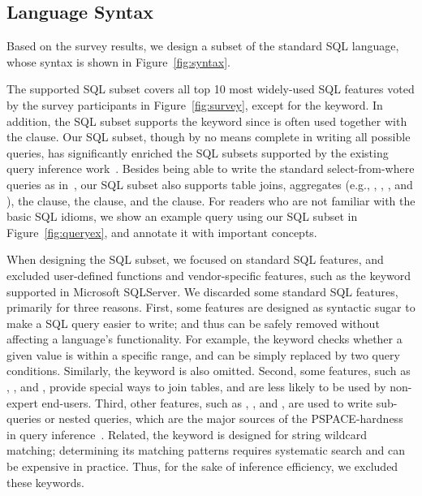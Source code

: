 \subsection{Language Syntax}
\label{sec:syntax}

Based on the survey results, we design a subset
of the standard SQL language, whose
syntax is shown in Figure~\ref{fig:syntax}.


The supported SQL subset covers all top 10 most widely-used SQL
features voted by the survey participants
in Figure~\ref{fig:survey}, except for the  keyword.
In addition, the SQL subset supports the 
keyword since  is often used together with the  clause.
Our SQL subset, though by no means complete in writing all
possible queries, has significantly
enriched the SQL subsets supported by the existing query inference
work~\cite{DasSarma:2010, Tran:2009}. Besides being able to write the
standard select-from-where queries as in~\cite{DasSarma:2010, Tran:2009},
our SQL subset also supports table joins, aggregates
(e.g., , , , and ),
the  clause, the  clause,
and the  clause. For readers who are not
familiar with the basic SQL idioms, we show an example query
using our SQL subset in Figure~\ref{fig:queryex}, and annotate
it with important concepts.


When designing the SQL subset, we focused on standard
SQL features, and excluded user-defined functions and
vendor-specific features, such as the 
keyword supported in Microsoft SQLServer. 
We discarded some standard SQL features, primarily for
three reasons. First, some features are designed
as syntactic sugar to make a SQL query easier to write;
and thus can be safely removed without affecting a language's
functionality. For example, the 
keyword checks whether a given value is within a specific
range, and can be simply replaced by two query conditions.
Similarly, the  keyword is also omitted.
Second, some features, such as 
, , and ,
provide special ways to join tables, and are less likely to be
used by non-expert end-users.
Third, other features, such as , , and ,
are used to write sub-queries or nested queries, which are the major sources
of the PSPACE-hardness in query inference~\cite{DasSarma:2010}.
Related, the  keyword is designed for string
wildcard matching; determining its matching
patterns requires systematic search and can be
expensive in practice. Thus, 
for the sake of inference efficiency, we excluded these keywords.

